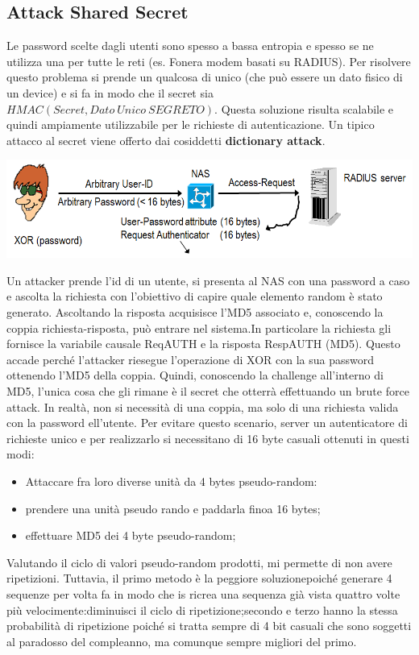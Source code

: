 \documentclass{book}
\theoremstyle{remark}
\begin{document}
\subsection{Attack Shared Secret}
Le password scelte dagli utenti sono spesso a bassa entropia e spesso se ne utilizza una per tutte le reti (es\@. Fonera modem basati su RADIUS)\@.
Per risolvere questo problema si prende un qualcosa di unico (che può essere un dato fisico di un device) e si fa in modo che il secret sia \(HMAC (Secret,Dato\ Unico\ SEGRETO)\)\@. Questa soluzione risulta scalabile e quindi ampiamente utilizzabile per le richieste di autenticazione\@.
Un tipico attacco al secret viene offerto dai cosiddetti \textbf{dictionary attack}\@.\begin{center}
	\includegraphics[scale=0.4]{dictionaryattackRADIUS.png}
\end{center}
Un attacker prende l'id di un utente, si presenta al NAS con una password a caso e ascolta la richiesta con l'obiettivo di capire quale elemento random è stato generato\@. Ascoltando la risposta acquisisce l'MD5 associato e, conoscendo la coppia richiesta-risposta, può entrare nel sistema\@.In particolare la richiesta gli fornisce la variabile causale ReqAUTH e la risposta RespAUTH (MD5)\@. Questo accade perché l'attacker riesegue l'operazione di XOR con la sua password ottenendo l'MD5 della coppia\@. Quindi, conoscendo la challenge all'interno di MD5, l'unica cosa che gli rimane è il secret che otterrà effettuando un brute force attack\@. In realtà, non si necessità di una coppia, ma solo di una richiesta valida con la password ell'utente\@.\newline
Per evitare questo scenario, server un autenticatore di richieste unico e per realizzarlo si necessitano di 16 byte casuali ottenuti in questi modi:\begin{itemize}
	\item Attaccare fra loro diverse unità da 4  bytes pseudo-random:
	\item prendere una unità pseudo rando e paddarla finoa  16 bytes;\@
	\item effettuare MD5 dei 4 byte pseudo-random;\@
\end{itemize}
Valutando il ciclo di valori pseudo-random prodotti, mi permette di non avere ripetizioni\@. Tuttavia, il primo metodo è la peggiore soluzionepoiché generare 4 sequenze per volta fa in modo che is ricrea una sequenza già vista quattro volte più velocimente:\@si diminuisci il ciclo di ripetizione;\@il secondo e terzo hanno la stessa probabilità di ripetizione poiché si tratta sempre di 4 bit casuali che sono soggetti al paradosso del compleanno, ma comunque sempre migliori del primo\@.
\end{document}
